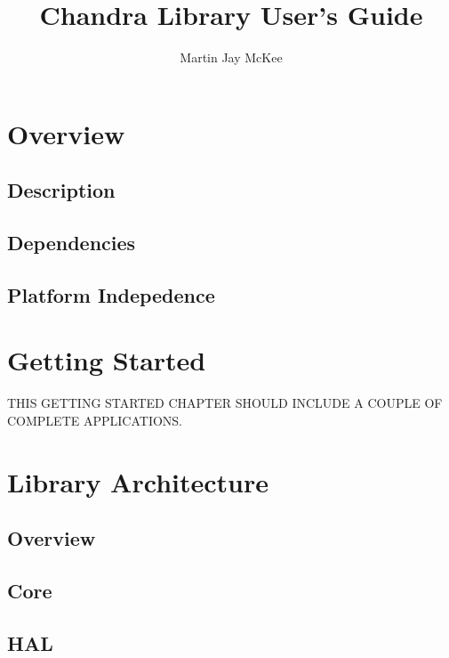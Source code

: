 \documentclass[12pt,a4paper,article]{memoir} %
\title{Chandra Library User's Guide}
\author{Martin Jay McKee}
\begin{document}

\maketitle
\tableofcontents* %

\chapter{Overview}
\section{Description}
\section{Dependencies}
\section{Platform Indepedence}

\chapter{Getting Started}
THIS GETTING STARTED CHAPTER SHOULD INCLUDE A COUPLE OF COMPLETE APPLICATIONS.

\section{}
\subsection{}

\chapter{Library Architecture}
\section{Overview}
\section{Core}
\section{HAL}
\end{document}

